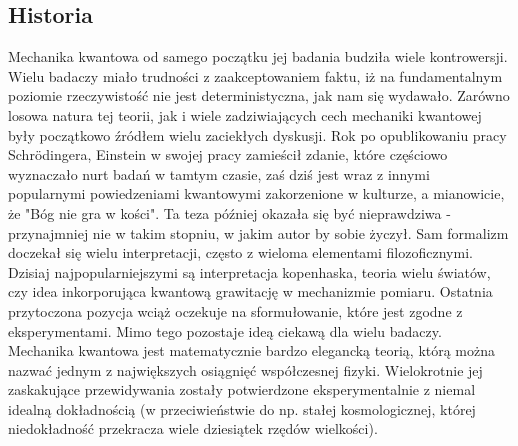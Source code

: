 \documentclass[10pt]{article} %
\begin{document}
\subsection{Historia}
Mechanika kwantowa od samego początku jej badania budziła wiele kontrowersji. Wielu badaczy miało trudności z zaakceptowaniem faktu, iż
na fundamentalnym poziomie rzeczywistość nie jest deterministyczna, jak nam się wydawało. Zarówno losowa natura tej teorii, jak i wiele zadziwiających cech mechaniki kwantowej były początkowo źródłem wielu zaciekłych dyskusji. Rok po opublikowaniu pracy Schrödingera, Einstein w swojej pracy zamieścił zdanie, które częściowo wyznaczało nurt badań w tamtym czasie, zaś dziś jest wraz z innymi popularnymi powiedzeniami kwantowymi zakorzenione w kulturze, a mianowicie, że "Bóg nie gra w kości". Ta teza później okazała się być nieprawdziwa - przynajmniej nie w takim stopniu, w jakim autor by sobie życzył. Sam formalizm doczekał się wielu interpretacji, często z wieloma elementami filozoficznymi. Dzisiaj najpopularniejszymi są interpretacja kopenhaska, teoria wielu światów, czy idea inkorporująca kwantową grawitację w mechanizmie pomiaru. Ostatnia przytoczona pozycja wciąż oczekuje na sformułowanie, które jest zgodne z eksperymentami. Mimo tego pozostaje ideą ciekawą dla wielu badaczy. Mechanika kwantowa jest matematycznie bardzo elegancką teorią, którą można nazwać jednym z największych osiągnięć współczesnej fizyki. Wielokrotnie jej zaskakujące przewidywania zostały potwierdzone eksperymentalnie z niemal idealną dokładnością (w przeciwieństwie do np. stałej kosmologicznej, której niedokładność przekracza wiele dziesiątek rzędów wielkości). 
\end{document}
